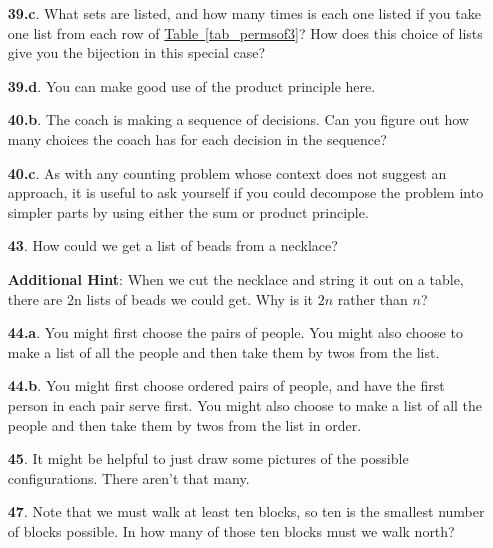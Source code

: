 \documentclass[10pt,]{book}
\theoremstyle{plain}
\theoremstyle{definition}
\theoremstyle{definition}
\numberwithin{equation}{chapter}
\begin{document}
\begin{itemize}[itemsep=1em]
\item[\textbf{39.c}.]\hypertarget{p-229}{}%
What sets are listed, and how many times is each one listed if you take one list from each row of \hyperref[tab_permsof3]{Table~\ref{tab_permsof3}}? How does this choice of lists give you the bijection in this special case?%

\item[\textbf{39.d}.]\hypertarget{p-232}{}%
You can make good use of the product principle here.%

\item[\textbf{40.b}.]\hypertarget{p-238}{}%
The coach is making a sequence of decisions. Can you figure out how many choices the coach has for each decision in the sequence?%

\item[\textbf{40.c}.]\hypertarget{p-241}{}%
As with any counting problem whose context does not suggest an approach, it is useful to ask yourself if you could decompose the problem into simpler parts by using either the sum or product principle.%

\item[\textbf{43}.]\hypertarget{p-252}{}%
How could we get a list of beads from a necklace?%

\par\smallskip
\noindent\textbf{Additional Hint}: \hypertarget{p-253}{}%
When we cut the necklace and string it out on a table, there are 2n lists of beads we could get. Why is it \(2n\) rather than \(n\)?%

\item[\textbf{44.a}.]\hypertarget{p-257}{}%
You might first choose the pairs of people. You might also choose to make a list of all the people and then take them by twos from the list.%

\item[\textbf{44.b}.]\hypertarget{p-261}{}%
You might first choose ordered pairs of people, and have the first person in each pair serve first. You might also choose to make a list of all the people and then take them by twos from the list in order.%

\item[\textbf{45}.]\hypertarget{p-265}{}%
It might be helpful to just draw some pictures of the possible configurations. There aren't that many.%

\item[\textbf{47}.]\hypertarget{p-270}{}%
Note that we must walk at least ten blocks, so ten is the smallest number of blocks possible. In how many of those ten blocks must we walk north?%


\end{itemize}
\end{document}
